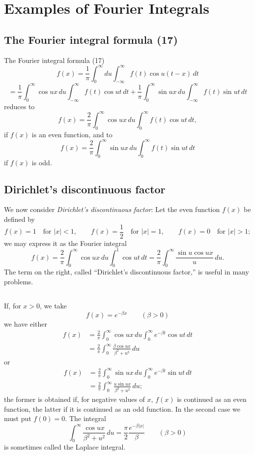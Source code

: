 \section{Examples of Fourier Integrals}
\subsection{The Fourier integral formula (17)}
The Fourier integral formula (17)
\[
f(x)=\frac1\pi\int_0^{\infty}du\int_{-\infty}^{\infty}f(t)\cos u(t-x)\,dt
\]
\[
=\frac1\pi\int_0^{\infty}\cos ux\,du\int_{-\infty}^{\infty}f(t)\cos ut\,dt
+\frac1\pi\int_0^{\infty}\sin ux\,du\int_{-\infty}^{\infty}f(t)\sin ut\,dt
\]
reduces to
\[
f(x)=\frac2\pi\int_0^{\infty}\cos ux\,du\int_0^{\infty}f(t)\cos ut\,dt,
\]
if $f(x)$ is an even function, and to
\[
f(x)=\frac2\pi\int_0^{\infty}\sin ux\,du\int_0^{\infty}f(t)\sin ut\,dt
\]
if $f(x)$ is odd.

\subsection{Dirichlet's discontinuous factor}
We now consider \emph{Dirichlet's discontinuous factor}: Let the even function $f(x)$ be defined by
\[
f(x)=1\quad\text{for }|x|<1,
\qquad
f(x)=\frac12\quad\text{for }|x|=1,
\qquad
f(x)=0\quad\text{for }|x|>1;
\]
we may express it as the Fourier integral
\[
f(x)=\frac2\pi\int_0^{\infty}\cos ux\,du\int_0^1\cos ut\,dt
=\frac2\pi\int_0^{\infty}\frac{\sin u\cos ux}{u}\,du.
\]
The term on the right, called ``Dirichlet's discontinuous factor,'' is useful in many problems.

\subsection{}
If, for $x>0$, we take
\[
f(x)=e^{-\beta x}\qquad(\beta>0)
\]
we have either
\[
\begin{aligned}
f(x)
&=\frac2\pi\int_0^{\infty}\cos ux\,du\int_0^{\infty}e^{-\beta t}\cos ut\,dt\\
&=\frac2\pi\int_0^{\infty}\frac{\beta\cos ux}{\beta^2+u^2}\,du
\end{aligned}
\]
or
\[
\begin{aligned}
f(x)
&=\frac2\pi\int_0^{\infty}\sin ux\,du\int_0^{\infty}e^{-\beta t}\sin ut\,dt\\
&=\frac2\pi\int_0^{\infty}\frac{u\sin ux}{\beta^2+u^2}\,du;
\end{aligned}
\]
the former is obtained if, for negative values of $x$, $f(x)$ is continued as an even function, the latter if it is continued as an odd function. In the second case we must put $f(0)=0$. The integral
\[
\int_0^{\infty}\frac{\cos ux}{\beta^2+u^2}\,du
=\frac\pi2\frac{e^{-\beta|x|}}{\beta}\qquad(\beta>0)
\]
is sometimes called the Laplace integral.

